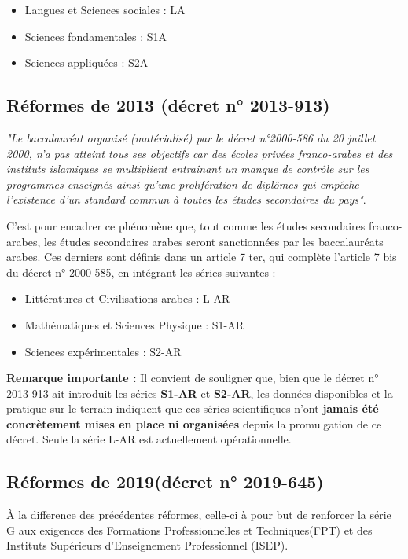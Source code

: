 \begin{itemize}
    \item Langues et Sciences sociales : LA
    \item Sciences fondamentales : S1A
    \item Sciences appliquées : S2A
\end{itemize}

\subsection{Réformes de 2013 (décret n° 2013-913)}

\textit{"Le baccalauréat organisé (matérialisé) par le décret n°2000-586 du 20 juillet 2000, 
n'a pas atteint tous ses objectifs car des écoles privées franco-arabes et des instituts islamiques se multiplient entraînant un manque de contrôle
sur les programmes enseignés ainsi qu'une prolifération de diplômes qui empêche l'existence d'un standard commun à toutes les études secondaires du pays"}\cite{decret2013}.

C'est pour encadrer ce phénomène que, tout comme les études secondaires franco-arabes, les études secondaires arabes seront sanctionnées par les baccalauréats arabes. 
Ces derniers sont définis dans un article 7 ter, qui complète l'article 7 bis du décret n° 2000-585, en intégrant les séries suivantes :

\begin{itemize}
    \item Littératures et Civilisations arabes : L-AR 
    \item Mathématiques et Sciences Physique : S1-AR
    \item Sciences expérimentales : S2-AR
\end{itemize} 

\textbf{Remarque importante :}
Il convient de souligner que, bien que le décret n° 2013-913 ait introduit les séries \textbf{S1-AR} et \textbf{S2-AR},
les données disponibles et la pratique sur le terrain indiquent que ces séries scientifiques n'ont \textbf{jamais été concrètement mises en place ni organisées} depuis la promulgation de ce décret.
Seule la série L-AR est actuellement opérationnelle.

\subsection{Réformes de 2019(décret n° 2019-645)}

À la difference des précédentes réformes, celle-ci à pour but de renforcer la série G aux exigences des Formations Professionnelles et Techniques(FPT)
et des Instituts Supérieurs d'Enseignement Professionnel (ISEP).

